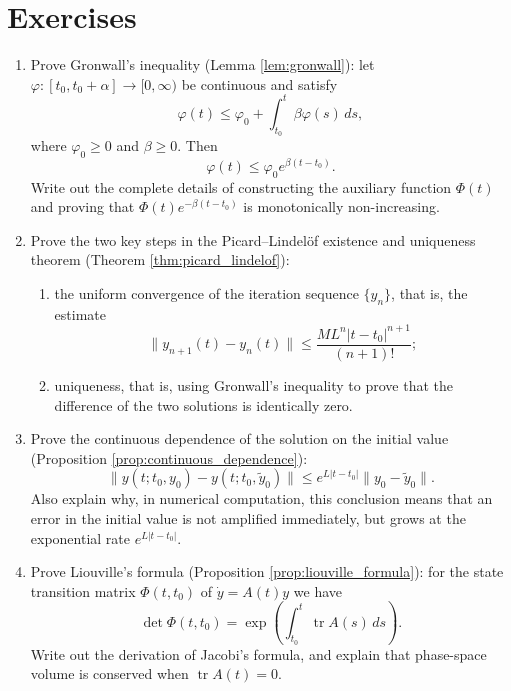 \section*{Exercises}

\begin{enumerate}[leftmargin=3em, label=\textbf{Exercise \arabic*}]
    \item Prove Gronwall's inequality (Lemma \ref{lem:gronwall}):
    let $\varphi:[t_0,t_0+\alpha]\to[0,\infty)$ be continuous and satisfy
    \[
    \varphi(t)\le\varphi_0+\int_{t_0}^{t}\beta\varphi(s)\,ds,
    \]
    where $\varphi_0\ge0$ and $\beta\ge0$. Then
    \[
    \varphi(t)\le\varphi_0e^{\beta(t-t_0)}.
    \]
    Write out the complete details of constructing the auxiliary function $\Phi(t)$ and proving that $\Phi(t)e^{-\beta(t-t_0)}$ is monotonically non-increasing.

    \item Prove the two key steps in the Picard--Lindelöf existence and uniqueness theorem (Theorem \ref{thm:picard_lindelof}):
    \begin{enumerate}[label=(\roman*)]
        \item the uniform convergence of the iteration sequence $\{y_n\}$, that is, the estimate
              \[
              \|y_{n+1}(t)-y_n(t)\|\le\frac{ML^n|t-t_0|^{n+1}}{(n+1)!};
              \]
        \item uniqueness, that is, using Gronwall's inequality to prove that the difference of the two solutions is identically zero.
    \end{enumerate}

    \item Prove the continuous dependence of the solution on the initial value (Proposition \ref{prop:continuous_dependence}):
    \[
    \|y(t;t_0,y_0)-y(t;t_0,\tilde{y}_0)\|\le e^{L|t-t_0|}\|y_0-\tilde{y}_0\|.
    \]
    Also explain why, in numerical computation, this conclusion means that an error in the initial value is not amplified immediately,
    but grows at the exponential rate $e^{L|t-t_0|}$.

    \item Prove Liouville's formula (Proposition \ref{prop:liouville_formula}):
    for the state transition matrix $\Phi(t,t_0)$ of $\dot{y}=A(t)y$ we have
    \[
    \det\Phi(t,t_0)=\exp\left(\int_{t_0}^{t}\operatorname{tr}A(s)\,ds\right).
    \]
    Write out the derivation of Jacobi's formula, and explain that phase-space volume is conserved when $\operatorname{tr}A(t)=0$.


\end{enumerate}
